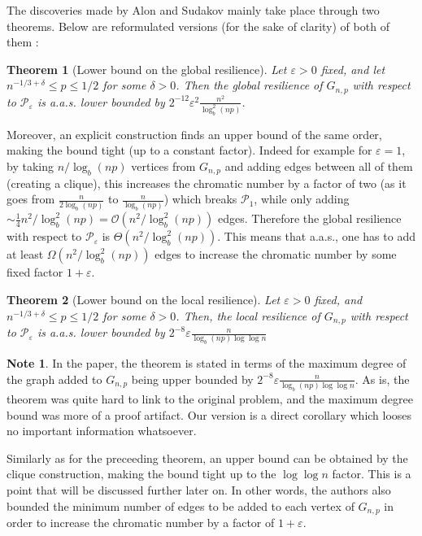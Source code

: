 \documentclass[10pt,journal,a4paper]{IEEEtran}
\newtheorem{theorem}{Theorem}
\theoremstyle{definition}   %
\newtheorem*{note}{Note}
\begin{document}
The discoveries made by Alon and Sudakov mainly take place through two theorems. Below are reformulated versions (for the sake of clarity) of both of them : 

\begin{theorem}[Lower bound on the global resilience]
Let $\varepsilon > 0$ fixed, and let $n^{-1 / 3 + \delta} \leq p \leq 1 / 2$ for some $\delta > 0$. Then the global resilience of $G_{n, p}$ with respect to $\mathcal{P}_\varepsilon$ is a.a.s. lower bounded by $2^{-12} \varepsilon^2 \frac{n^2}{\log_b^2 (np)}$.
\label{thm:glob_res}
\end{theorem}
Moreover, an explicit construction finds an upper bound of the same order, making the bound tight (up to a constant factor). Indeed for example for $\varepsilon = 1$, by taking $n / \log_b (np)$ vertices from $G_{n, p}$ and adding edges between all of them (creating a clique), this increases the chromatic number by a factor of two (as it goes from $\frac{n}{2 \log_b (np)}$ to $\frac{n}{\log_b (np)}$) which breaks $\mathcal{P}_1$, while only adding $\sim \frac{1}{4} n^2 / \log_b^2 (np) = \mathcal{O}(n^2 / \log_b^2 (np))$ edges. Therefore the global resilience with respect to $\mathcal{P}_\varepsilon$ is $\Theta( n^2 / \log_b^2 (np))$. This means that a.a.s., one has to add at least $\Omega( n^2 / \log_b^2 (np))$ edges to increase the chromatic number by some fixed factor $ 1 + \varepsilon$.

\begin{theorem}[Lower bound on the local resilience]
	Let $\varepsilon > 0$ fixed, and  $n^{-1 /3 + \delta} \leq p \leq 1 / 2$ for some $\delta > 0$. Then, the local resilience of $G_{n, p}$ with respect to $\mathcal{P}_\varepsilon$ is a.a.s. lower bounded by $2^{-8} \varepsilon \frac{n}{ \log_b(np) \log\log n} $
\label{thm:loc_res}
\end{theorem}
\begin{note}
	In the paper, the theorem is stated in terms of the maximum degree of the graph added to $G_{n, p}$ being upper bounded by $2^{-8}\varepsilon \frac{n}{\log_b(np) \log \log n}$. As is, the theorem was quite hard to link to the original problem, and the maximum degree bound was more of a proof artifact. Our version is a direct corollary which looses no important information whatsoever.
\end{note}
Similarly as for the preceeding theorem, an upper bound can be obtained by the clique construction, making the bound tight up to the $\log \log n$ factor. This is a point that will be discussed further later on. In other words, the authors also bounded the minimum number of edges to be added to each vertex of $G_{n, p}$ in order to increase the chromatic number by a factor of $1 + \varepsilon$. 
\end{document}
